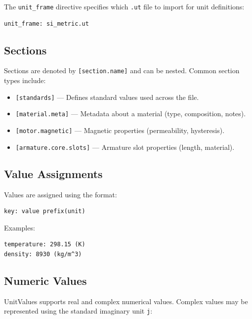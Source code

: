 \documentclass[11pt]{article}
\begin{document}
The \texttt{unit\_frame} directive specifies which \texttt{.ut} file to
import for unit definitions:

\begin{lstlisting}[language=UnitValuesUIV]
unit_frame: si_metric.ut
\end{lstlisting}

\subsection{Sections}

Sections are denoted by \texttt{[section.name]} and can be nested.
Common section types include:

\begin{itemize}
  \item \texttt{[standards]} --- Defines standard values used across the file.
  \item \texttt{[material.meta]} --- Metadata about a material
        (type, composition, notes).
  \item \texttt{[motor.magnetic]} --- Magnetic properties
        (permeability, hysteresis).
  \item \texttt{[armature.core.slots]} --- Armature slot properties
        (length, material).
\end{itemize}


\newpage

\subsection{Value Assignments}

Values are assigned using the format:

\begin{lstlisting}[language=UnitValuesUIV]
key: value prefix(unit)
\end{lstlisting}

Examples:

\begin{lstlisting}[language=UnitValuesUIV]
temperature: 298.15 (K)
density: 8930 (kg/m^3)
\end{lstlisting}

\subsection{Numeric Values}

UnitValues supports real and complex numerical values. Complex values may
be represented using the standard imaginary unit \texttt{j}:
\end{document}
